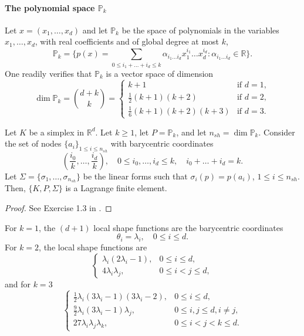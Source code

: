 \paragraph{The polynomial space $\mathbb{P}_k$} Let $x = (x_1, \dots, x_d)$ and let $\mathbb{P}_k$ be the space of polynomials in the variables $x_1, \dots, x_d$, with real coefficients and of global degree at most $k$,
\begin{equation*}
\mathbb{P}_k = \{ p(x) = \sum_{0 \le i_1 + \dots + i_d \le k} \alpha_{i_1 \dots i_d} x_1^{i_1} \dots x_d^{i_d} : \alpha_{i_1 \dots i_d} \in \mathbb{R} \}.
\end{equation*}
One readily verifies that $\mathbb{P}_k$ is a vector space of dimension
\begin{equation*}
\dim \mathbb{P}_k = \binom{d+k}{k} = \begin{cases} k+1 & \text{if } d=1, \\ \frac{1}{2}(k+1)(k+2) & \text{if } d=2, \\ \frac{1}{6}(k+1)(k+2)(k+3) & \text{if } d=3. \end{cases}
\end{equation*}

\begin{lemma}\label{lemma:simplicial_lagrange_fe}
    Let $K$ be a simplex in $\mathbb{R}^d$. Let $k \ge 1$, let $P = \mathbb{P}_k$, and let $n_{sh} = \dim \mathbb{P}_k$. Consider the set of nodes $\{a_i\}_{1 \le i \le n_{sh}}$ with barycentric coordinates
    \begin{equation*}
\left(\frac{i_0}{k}, \dots, \frac{i_d}{k}\right), \quad 0 \le i_0, \dots, i_d \le k, \quad i_0 + \dots + i_d = k.
\end{equation*}
    Let $\Sigma = \{\sigma_1, \dots, \sigma_{n_{sh}}\}$ be the linear forms such that $\sigma_i(p) = p(a_i)$, $1 \le i \le n_{sh}$. Then, $\{K, P, \Sigma\}$ is a Lagrange finite element.
    \begin{proof}
        See Exercise 1.3 in \cite{ern2004theory}.
    \end{proof}
\end{lemma}

For $k=1$, the $(d+1)$ local shape functions are the barycentric coordinates
\begin{equation*}
\theta_i = \lambda_i, \quad 0 \le i \le d.
\end{equation*}
For $k=2$, the local shape functions are
\begin{equation*}
\begin{cases} \lambda_i(2\lambda_i - 1), & 0 \le i \le d, \\ 4\lambda_i \lambda_j, & 0 \le i < j \le d, \end{cases}
\end{equation*}
and for $k=3$
\begin{equation*}
\begin{cases} \frac{1}{2}\lambda_i(3\lambda_i - 1)(3\lambda_i - 2), & 0 \le i \le d, \\ \frac{9}{2}\lambda_i(3\lambda_i - 1)\lambda_j, & 0 \le i,j \le d, i \ne j, \\ 27\lambda_i \lambda_j \lambda_k, & 0 \le i < j < k \le d. \end{cases}
\end{equation*}

